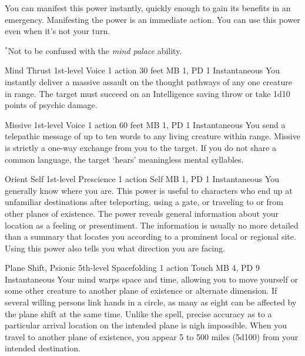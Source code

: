   You can manifest this power instantly,
  quickly enough to gain its benefits in an emergency.
  Manifesting the power is an immediate action.
  You can use this power even when it's not your turn.

  $^*$Not to be confused with the \emph{mind palace} ability.

\DndPowerHeader%
  {Mind Thrust}
  {1st-level Voice}
  {1 action}
  {30 feet}
  {MB 1, PD 1}
  {Instantaneous}
You instantly deliver a massive assault on the thought pathways
of any one creature in range.
The target must succeed on an Intelligence saving throw
or take 1d10 points of psychic damage.

\DndPowerHeader%
  {Missive}
  {1st-level Voice}
  {1 action}
  {60 feet}
  {MB 1, PD 1}
  {Instantaneous}
  You send a telepathic message of up to ten words to
  any living creature within range.
  Missive is strictly a one-way exchange from you to the target.
  If you do not share a common language,
  the target `hears' meaningless mental syllables.

\DndPowerHeader%
  {Orient Self}
  {1st-level Prescience}
  {1 action}
  {Self}
  {MB 1, PD 1}
  {Instantaneous}
You generally know where you are.
This power is useful to characters who end up at unfamiliar destinations
after teleporting,
using a gate,
or traveling to or from other planes of existence.
The power reveals general information about your location
as a feeling or presentiment.
The information is usually no more detailed than a summary
that locates you according to a prominent local or regional site.
Using this power also tells you what direction you are facing.

\DndPowerHeader%
  {Plane Shift, Psionic}
  {5th-level Spacefolding}
  {1 action}
  {Touch}
  {MB 4, PD 9}
  {Instantaneous}
  Your mind warps space and time,
  allowing you to move yourself
  or some other creature to another plane of existence
  or alternate dimension.
  If several willing persons link hands in a circle,
  as many as eight can be affected by the plane shift at the same time.
  Unlike the  spell,
  precise accuracy as to a particular arrival location
  on the intended plane is nigh impossible.
  When you travel to another plane of existence,
  you appear 5 to 500 miles (5d100) from your intended destination.

